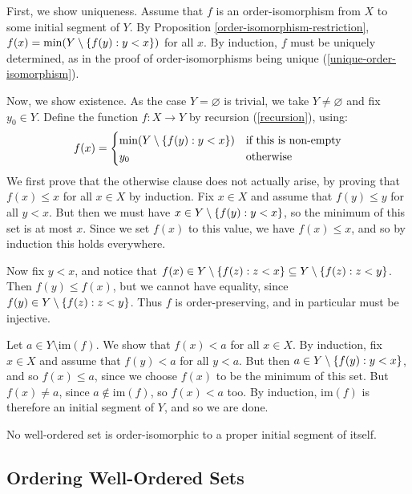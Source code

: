 \documentclass{article}
\begin{document}
\begin{prf}
    First, we show uniqueness. Assume that $f$ is an order-isomorphism from $X$ to some initial segment of $Y$. By Proposition \ref{order-isomorphism-restriction}, $f(x) = \min(Y \setminus \left\lbrace f(y) : y < x \right\rbrace)$ for all $x$. By induction, $f$ must be uniquely determined, as in the proof of order-isomorphisms being unique (\ref{unique-order-isomorphism}).
    
    Now, we show existence. As the case $Y = \varnothing$ is trivial, we take $Y \neq \varnothing$ and fix $y_0 \in Y$. Define the function $f: X \to Y$ by recursion (\ref{recursion}), using:
    \[
	f(x) = \begin{cases}
		 \min(Y \setminus \left\lbrace f(y) : y < x \right\rbrace) & \text{if this is non-empty} \\
		 y_0 & \!\mathrel{\, \text{otherwise}}
	\end{cases}
	\]
	We first prove that the otherwise clause does not actually arise, by proving that $f(x) \leq x$ for all $x \in X$ by induction. Fix $x \in X$ and assume that $f(y) \leq y$ for all $y < x$. But then we must have $x \in Y \setminus \left\lbrace f(y) : y < x \right\rbrace$, so the minimum of this set is at most $x$. Since we set $f(x)$ to this value, we have $f(x) \leq x$, and so by induction this holds everywhere.
	
	Now fix $y < x$, and notice that $f(x) \in Y \setminus \left\lbrace f(z): z < x \right\rbrace \subseteq Y \setminus \left\lbrace f(z): z < y \right\rbrace$. Then $f(y) \leq f(x)$, but we cannot have equality, since $f(y) \in Y \setminus \left\lbrace f(z): z < y \right\rbrace$. Thus $f$ is order-preserving, and in particular must be injective.
	
	Let $a \in Y \setminus \mathrm{im}(f)$. We show that $f(x) < a$ for all $x \in X$. By induction, fix $x \in X$ and assume that $f(y) < a$ for all $y < a$. But then $a \in Y \setminus \left\lbrace f(y) : y < x \right\rbrace$, and so $f(x) \leq a$, since we choose $f(x)$ to be the minimum of this set. But $f(x) \neq a$, since $a \notin \mathrm{im}(f)$, so $f(x) < a$ too. By induction, $\mathrm{im}(f)$ is therefore an initial segment of $Y$, and so we are done.
\end{prf}

\begin{corollary}
    No well-ordered set is order-isomorphic to a proper initial segment of itself.
\end{corollary}


\subsection{Ordering Well-Ordered Sets}
\end{document}
